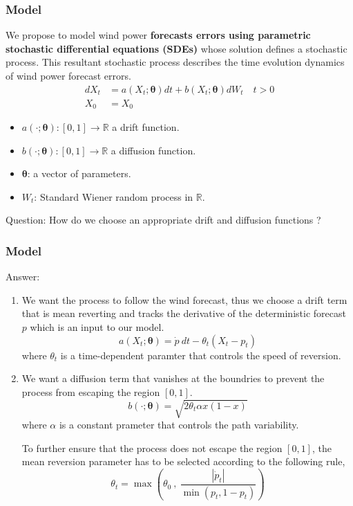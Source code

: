 \documentclass[aspectratio=169]{beamer}\usepackage[utf8]{inputenc}
\newcommand{\R}{\mathbb{R}}
\begin{document}
\begin{frame}\frametitle{Model}
We propose to model wind power\textbf{ forecasts errors using parametric stochastic differential equations (SDEs)} whose solution defines a stochastic process. This resultant stochastic process describes the time evolution dynamics of wind power forecast errors.
\begin{equation}
\begin{split}
dX_t &= a(X_t; \bm{\theta}) dt + b (X_t; \bm{\theta} ) dW_t \quad t > 0 \\
X_0 & = X_0
\end{split}
\label{main}
\end{equation}

\begin{itemize}
\item $a(\cdot; \bm{\theta}):[0,1] \to \R $  a drift function.
\item $b (\cdot; \bm{\theta} ):[0,1] \to \R$  a  diffusion function.
\item $\bm{\theta}$: a vector of parameters.
\item $W_t$: Standard Wiener random process in $\R$.
\end{itemize}

Question: How do we choose an appropriate drift and diffusion functions ?

\end{frame}


\begin{frame}\frametitle{Model}
Answer:
\begin{enumerate}
  \item We want the process to follow the wind forecast, thus we choose a drift term that is mean reverting and tracks the derivative of the deterministic forecast $p$ which is an input to our model.
  \begin{equation}
    a(X_t; \bm{\theta})=  \dot{p} \ dt - \theta_t(X_t - p_t)
  \end{equation}
where $\theta_t$ is a time-dependent paramter that controls the speed of reversion.
  \item We want a diffusion term that vanishes at the boundries to prevent the process from escaping the region $[0,1]$.
  \begin{equation}
    b (\cdot; \bm{\theta} )= \sqrt{2 \theta_t \alpha x (1-x)}
  \end{equation}
  where $\alpha$ is a constant prameter that controls the path variability.


To further ensure that the process does not escape the region $[0,1]$, the mean reversion parameter has to be selected according to the following rule,
\begin{equation}
\theta_t = \max \left( \theta_0 \ , \ \frac{|\dot{p}_t|}{\min (p_t, 1-p_t)}  \right ) \label{theta_t}
\end{equation}

\end{enumerate}
\end{frame}
\end{document}
